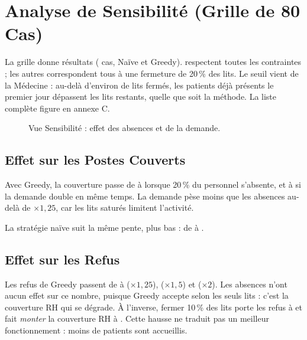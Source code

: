 \section{Analyse de Sensibilité (Grille de 80 Cas)}

La grille donne \NbResSens{} résultats (\NbCas{} cas, Naïve et Greedy). \NbResSensOk{} respectent toutes les contraintes ; les \NbResSensKo{} autres correspondent tous à une fermeture de 20\,\% des lits. Le seuil vient de la Médecine : au-delà d'environ \LimiteMed{} de lits fermés, les patients déjà présents le premier jour dépassent les lits restants, quelle que soit la méthode. La liste complète figure en annexe C.

\begin{figure}[H]
    \centering
    \caption{Vue Sensibilité : effet des absences et de la demande.}
    \label{fig:sensibilite}
\end{figure}

\subsection{Effet sur les Postes Couverts}


Avec Greedy, la couverture passe de \SensCouvBase{} à \SensCouvAbs{} lorsque 20\,\% du personnel s'absente, et à \SensCouvPire{} si la demande double en même temps. La demande pèse moins que les absences au-delà de $\times 1{,}25$, car les lits saturés limitent l'activité.



La stratégie naïve suit la même pente, plus bas : de \SensNaiveBase{} à \SensNaiveAbs{}.

\subsection{Effet sur les Refus}


Les refus de Greedy passent de \SensRefusBase{} à \SensRefusVc{} ($\times 1{,}25$), \SensRefusCq{} ($\times 1{,}5$) et \SensRefusDx{} ($\times 2$). Les absences n'ont aucun effet sur ce nombre, puisque Greedy accepte selon les seuls lits : c'est la couverture RH qui se dégrade. À l'inverse, fermer 10\,\% des lits porte les refus à \SensRefusFermee{} et fait \emph{monter} la couverture RH à \SensCouvFermee{}. Cette hausse ne traduit pas un meilleur fonctionnement : moins de patients sont accueillis.

